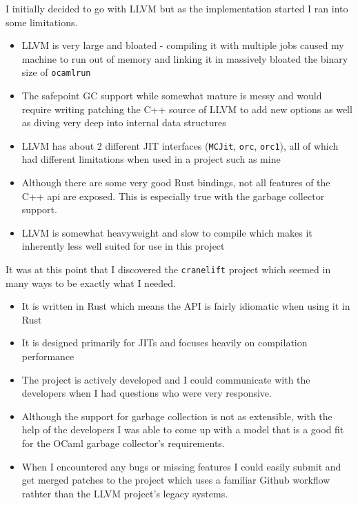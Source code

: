 I initially decided to go with LLVM but as the implementation started I ran into some limitations.

\begin{itemize}
      \item LLVM is very large and bloated - compiling it with multiple jobs caused my machine to
            run
            out of memory and linking it in massively bloated the binary size of \texttt{ocamlrun}
      \item The safepoint GC support while somewhat mature is messy and would require writing
            patching the C++ source of LLVM to add new options as well as diving very deep into
            internal data
            structures
      \item LLVM has about 2 different JIT interfaces (\texttt{MCJit}, \texttt{orc},
            \texttt{orc1}),
            all of which had different limitations when used in a project such as mine
      \item Although there are some very good Rust bindings, not all features of the C++ api are
            exposed. This is especially true with the garbage collector support.
      \item LLVM is somewhat heavyweight and slow to compile which makes it inherently less well
            suited for use in this project
\end{itemize}

It was at this point that I discovered the \texttt{cranelift} project which seemed in many ways to
be exactly what I needed.

\begin{itemize}
      \item It is written in Rust which means the API is fairly idiomatic when using it in Rust
      \item It is designed primarily for JITs and focuses heavily on compilation performance
      \item The project is actively developed and I could communicate with the developers when I
            had
            questions who were very responsive.
      \item Although the support for garbage collection is not as extensible, with the help of the
            developers I was able to come up with a model that is a good fit for the OCaml garbage
            collector's
            requirements.
      \item When I encountered any bugs or missing features I could easily submit and get merged
            patches to the project which uses a familiar Github workflow rathter than the LLVM
            project's legacy
            systems.
\end{itemize}

